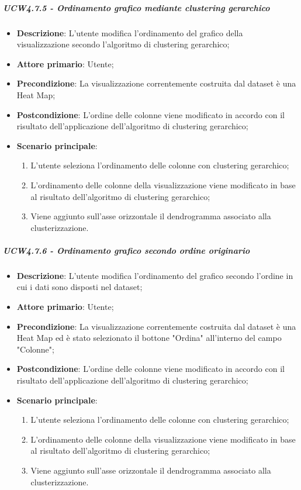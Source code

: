 \subparagraph{UCW4.7.5 - Ordinamento grafico mediante clustering gerarchico}
\label{spar:ucw4.7.5}
\begin{itemize}
    \item \textbf{Descrizione}:     L'utente modifica l'ordinamento del grafico  della visualizzazione secondo l'algoritmo di clustering gerarchico;
    \item \textbf{Attore primario}: Utente;
    \item \textbf{Precondizione}:   La visualizzazione correntemente costruita dal dataset è una Heat Map;
    \item \textbf{Postcondizione}:  L'ordine delle colonne viene modificato in accordo con il risultato dell'applicazione dell'algoritmo di clustering gerarchico;
    \item \textbf{Scenario principale}:
    \begin{enumerate}
        \item L'utente seleziona l'ordinamento delle colonne con clustering gerarchico;
        \item L'ordinamento delle colonne della visualizzazione viene modificato in base al risultato dell'algoritmo di clustering gerarchico;
        \item Viene aggiunto sull'asse orizzontale il dendrogramma associato alla clusterizzazione.
    \end{enumerate}
\end{itemize}

\subparagraph{UCW4.7.6 - Ordinamento grafico secondo ordine originario }
\label{spar:ucw4.7.6}
\begin{itemize}
    \item \textbf{Descrizione}:     L'utente modifica l'ordinamento del grafico secondo l'ordine in cui i dati sono disposti nel dataset;
    \item \textbf{Attore primario}: Utente;
    \item \textbf{Precondizione}:   La visualizzazione correntemente costruita dal dataset è una Heat Map ed è stato selezionato il bottone "Ordina" all'interno del campo "Colonne";
    \item \textbf{Postcondizione}:  L'ordine delle colonne viene modificato in accordo con il risultato dell'applicazione dell'algoritmo di clustering gerarchico;
    \item \textbf{Scenario principale}:
    \begin{enumerate}
        \item L'utente seleziona l'ordinamento delle colonne con clustering gerarchico;
        \item L'ordinamento delle colonne della visualizzazione viene modificato in base al risultato dell'algoritmo di clustering gerarchico;
        \item Viene aggiunto sull'asse orizzontale il dendrogramma associato alla clusterizzazione.
    \end{enumerate}
\end{itemize}



